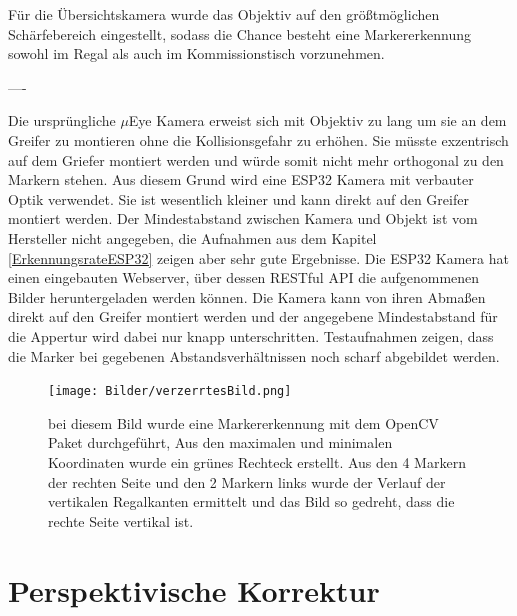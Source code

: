     Für die Übersichtskamera wurde das Objektiv auf den größtmöglichen Schärfebereich eingestellt, sodass die Chance besteht eine Markererkennung sowohl im Regal als auch im Kommissionstisch vorzunehmen. 

    ----

    Die ursprüngliche $\mu$Eye Kamera erweist sich mit Objektiv zu lang um sie an dem Greifer zu montieren ohne die Kollisionsgefahr zu erhöhen. 
    Sie müsste exzentrisch auf dem Griefer montiert werden und würde somit nicht mehr orthogonal zu den Markern stehen.
    Aus diesem Grund wird eine ESP32 Kamera mit verbauter Optik verwendet.
    Sie ist wesentlich kleiner und kann direkt auf den Greifer montiert werden.
    Der Mindestabstand zwischen Kamera und Objekt ist vom Hersteller nicht angegeben, die Aufnahmen aus dem Kapitel \ref{ErkennungsrateESP32} 
    zeigen aber sehr gute Ergebnisse.
    Die ESP32 Kamera hat einen eingebauten Webserver, über dessen RESTful API die aufgenommenen Bilder heruntergeladen werden können. 
    Die Kamera kann von ihren Abmaßen direkt auf den Greifer montiert werden und der angegebene Mindestabstand für die Appertur wird dabei nur knapp unterschritten. 
    Testaufnahmen zeigen, dass die Marker bei gegebenen Abstandsverhältnissen noch scharf abgebildet werden. 

    \begin{figure}
        \caption[Optische Verzerrung der Übersichtskamera]
        {\small bei diesem Bild wurde eine Markererkennung mit dem OpenCV Paket durchgeführt, Aus den maximalen und minimalen Koordinaten wurde ein grünes Rechteck erstellt. Aus den 4 Markern der rechten Seite und den 2 Markern links wurde der Verlauf der vertikalen Regalkanten ermittelt und das Bild so gedreht, dass die rechte Seite vertikal ist.}\label{fig:figure10}
        \texttt{[image: Bilder/verzerrtesBild.png]}
        \centering
    \end{figure}

    \section {Perspektivische Korrektur}

